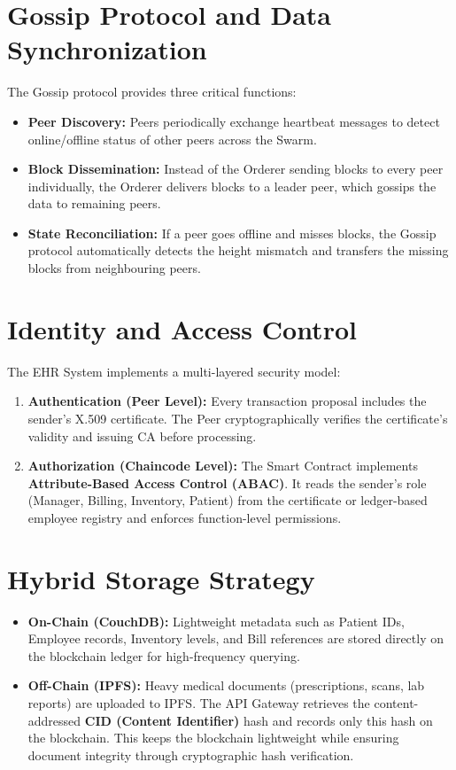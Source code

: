 \section{Gossip Protocol and Data Synchronization}

The Gossip protocol provides three critical functions:

\begin{itemize}
    \item \textbf{Peer Discovery:} Peers periodically exchange heartbeat messages to detect online/offline status of other peers across the Swarm.
    \item \textbf{Block Dissemination:} Instead of the Orderer sending blocks to every peer individually, the Orderer delivers blocks to a leader peer, which gossips the data to remaining peers.
    \item \textbf{State Reconciliation:} If a peer goes offline and misses blocks, the Gossip protocol automatically detects the height mismatch and transfers the missing blocks from neighbouring peers.
\end{itemize}

\section{Identity and Access Control}

The EHR System implements a multi-layered security model:

\begin{enumerate}
    \item \textbf{Authentication (Peer Level):} Every transaction proposal includes the sender's X.509 certificate. The Peer cryptographically verifies the certificate's validity and issuing CA before processing.
    \item \textbf{Authorization (Chaincode Level):} The Smart Contract implements \textbf{Attribute-Based Access Control (ABAC)}. It reads the sender's role (Manager, Billing, Inventory, Patient) from the certificate or ledger-based employee registry and enforces function-level permissions.
\end{enumerate}

\section{Hybrid Storage Strategy}

\begin{itemize}
    \item \textbf{On-Chain (CouchDB):} Lightweight metadata such as Patient IDs, Employee records, Inventory levels, and Bill references are stored directly on the blockchain ledger for high-frequency querying.
    \item \textbf{Off-Chain (IPFS):} Heavy medical documents (prescriptions, scans, lab reports) are uploaded to IPFS. The API Gateway retrieves the content-addressed \textbf{CID (Content Identifier)} hash and records only this hash on the blockchain. This keeps the blockchain lightweight while ensuring document integrity through cryptographic hash verification.
\end{itemize}
